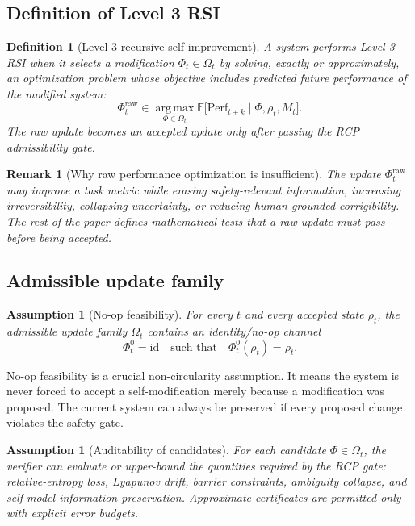 \documentclass[11pt]{article}
\newtheorem{definition}[theorem]{Definition}
\newtheorem{assumption}[theorem]{Assumption}
\newtheorem{remark}[theorem]{Remark}
\newcommand{\argmax}{\operatorname*{arg\,max}}
\newcommand{\id}{\mathrm{id}}
\newcommand{\1}{\mathbf{1}}
\begin{document}
\subsection{Definition of Level 3 RSI}

\begin{definition}[Level 3 recursive self-improvement]
A system performs Level 3 RSI when it selects a modification \(\Phi_t\in\Omega_t\) by solving, exactly or approximately, an optimization problem whose objective includes predicted future performance of the modified system:
\[
\Phi_t^{\mathrm{raw}}
\in
\argmax_{\Phi\in\Omega_t}
\mathbb E\bigl[\mathrm{Perf}_{t+k}\mid \Phi,\rho_t,M_t\bigr].
\]
The raw update becomes an accepted update only after passing the RCP admissibility gate.
\end{definition}

\begin{remark}[Why raw performance optimization is insufficient]
The update \(\Phi_t^{\mathrm{raw}}\) may improve a task metric while erasing safety-relevant information, increasing irreversibility, collapsing uncertainty, or reducing human-grounded corrigibility. The rest of the paper defines mathematical tests that a raw update must pass before being accepted.
\end{remark}

\subsection{Admissible update family}

\begin{assumption}[No-op feasibility]
For every \(t\) and every accepted state \(\rho_t\), the admissible update family \(\Omega_t\) contains an identity/no-op channel
\[
\Phi_t^0=\id
\quad\text{such that}\quad
\Phi_t^0(\rho_t)=\rho_t.
\]
\end{assumption}

No-op feasibility is a crucial non-circularity assumption. It means the system is never forced to accept a self-modification merely because a modification was proposed. The current system can always be preserved if every proposed change violates the safety gate.

\begin{assumption}[Auditability of candidates]
For each candidate \(\Phi\in\Omega_t\), the verifier can evaluate or upper-bound the quantities required by the RCP gate: relative-entropy loss, Lyapunov drift, barrier constraints, ambiguity collapse, and self-model information preservation. Approximate certificates are permitted only with explicit error budgets.
\end{assumption}
\end{document}
